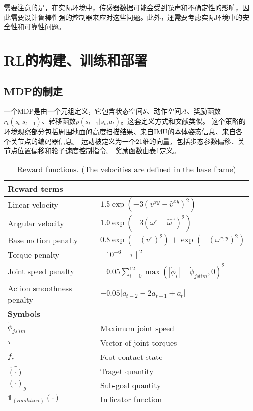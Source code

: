 需要注意的是，在实际环境中，传感器数据可能会受到噪声和不确定性的影响，因此需要设计鲁棒性强的控制器来应对这些问题。此外，还需要考虑实际环境中的安全性和可靠性问题。


\section{RL的构建、训练和部署}
\subsection{MDP的制定}

一个MDP是由一个元组定义，它包含状态空间$\mathcal{S}$、动作空间$\mathcal{A}$、奖励函数$r_t(s_t|s_{t+1})$、转移函数$p(s_{t+1}|s_t, a_t)$。这套定义方式和文献类似\cite[p]{Miki_Lee_Hwangbo_Wellhausen_Koltun_Hutter_2022}。
这个策略的环境观察部分包括周围地面的高度扫描结果、来自IMU的本体姿态信息、来自各个关节点的编码器信息。
运动被定义为一个21维的向量，包括步态参数偏移、关节点位置偏移和轮子速度控制指令。
奖励函数由表\ref{table:reward_functions}定义。
\begin{table}[h!]
    \begin{center}
      \caption{Reward functions. (The velocities are defined in the base frame)}
      \label{table:reward_functions}
      \begin{tabular}{l|l} %
        \hline
        \multicolumn{2}{l}{\textbf{Reward terms}}\\
        \hline
        Linear velocity & $1.5 \exp(-3(v^{xy}-\hat v^{xy})^2)$\\
        Angular velocity & $1.0\exp(-3(\omega^z-\hat\omega^z)^2)$\\
        Base motion penalty & $0.8\exp(-(v^z)^2)+\exp(-(\omega^{x,y})^2)$\\
        Torque penalty & $-10^{-6} \|\tau\|^2$\\
        Joint speed penalty & $-0.05\sum_{i=0}^{12}\max(|\dot \phi_i|-\dot\phi_{jslim},0)^2$\\
        Action smoothness penalty & $-0.05|a_{t-2}-2a_{t-1}+a_t|$\\
        \hline
        \multicolumn{2}{l}{\textbf{Symbols}}\\
        \hline
        $\dot \phi_{jslim}$ & Maximum joint speed\\
        $\tau$ & Vector of joint torques\\
        $f_c$ & Foot contact state\\
        $\hat{(\cdot)}$ & Traget quantity\\
        $(\cdot)_g$ & Sub-goal quantity\\
        $\mathbb{1}_{(condition)}(\cdot)$ & Indicator function\\
        \hline
      \end{tabular}
    \end{center}
\end{table}

